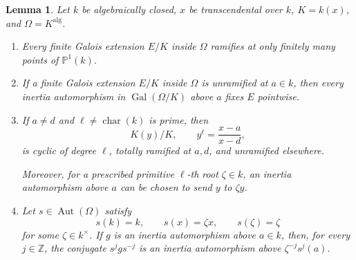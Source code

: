 \documentclass[11pt,a4paper]{amsart}
\newtheorem{lemma}[theorem]{Lemma}
\theoremstyle{definition}
\newcommand{\Z}{\mathbb Z}
\newcommand{\alg}{\mathrm{alg}}
\DeclareMathOperator{\Gal}{Gal}
\DeclareMathOperator{\Aut}{Aut}
\DeclareMathOperator{\charac}{char}
\begin{document}
\begin{lemma}\label{a:lem:ramification}
Let $k$ be algebraically closed, $x$ be transcendental over $k$, $K=k(x)$, and $\Omega=K^{\alg}$.
\begin{enumerate}[label=\textup{(\roman*)}]
\item Every finite Galois extension $E/K$ inside $\Omega$ ramifies at only finitely many points of $\mathbb P^1(k)$.
\item If a finite Galois extension $E/K$ inside $\Omega$
is unramified at $a\in k$, then every inertia automorphism
in $\Gal(\Omega/K)$ above $a$ fixes $E$ pointwise.
\item If $a\neq d$ and $\ell\neq\charac(k)$ is prime, then
\[
 K(y)/K,\qquad y^\ell=\frac{x-a}{x-d},
\]
is cyclic of degree $\ell$, totally ramified at $a,d$, and unramified elsewhere.

Moreover, for a prescribed primitive $\ell$-th root $\zeta\in k$, an inertia automorphism above $a$ can be chosen to send $y$ to $\zeta y$.

\item Let $s\in\Aut(\Omega)$ satisfy
\[
s(k)=k,\qquad s(x)=\zeta x, \qquad s(\zeta)=\zeta
\]
 for some
$\zeta\in k^\times$.
If $g$ is an inertia automorphism above $a\in k$,
then, for every $j\in\Z$, the conjugate $s^jgs^{-j}$
is an inertia automorphism above $\zeta^{-j}s^j(a)$.
\end{enumerate}
\end{lemma}
\end{document}

